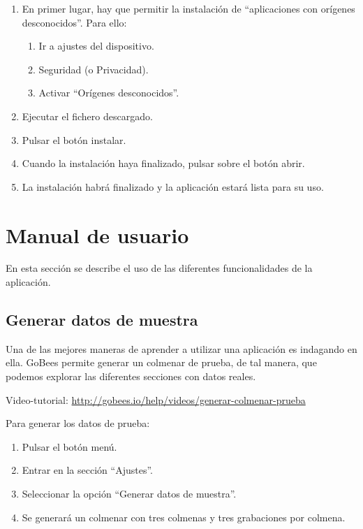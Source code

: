 \begin{enumerate}
\def\labelenumi{\arabic{enumi}.}
\tightlist
\item
  En primer lugar, hay que permitir la instalación de ``aplicaciones con
  orígenes desconocidos''. Para ello:

  \begin{enumerate}
  \def\labelenumii{\alph{enumii}.}
  \tightlist
  \item
    Ir a ajustes del dispositivo.
  \item
    Seguridad (o Privacidad).
  \item
    Activar ``Orígenes desconocidos''.
  \end{enumerate}
\item
  Ejecutar el fichero descargado.
\item
  Pulsar el botón instalar.
\item
  Cuando la instalación haya finalizado, pulsar sobre el botón abrir.
\item
  La instalación habrá finalizado y la aplicación estará lista para su
  uso.
\end{enumerate}

\section{Manual de usuario}\label{manual-de-usuario-1}

En esta sección se describe el uso de las diferentes funcionalidades de
la aplicación.

\subsection{Generar datos de muestra}\label{generar-datos-de-muestra}

Una de las mejores maneras de aprender a utilizar una aplicación es
indagando en ella. GoBees permite generar un colmenar de prueba, de tal
manera, que podemos explorar las diferentes secciones con datos reales.

Video-tutorial:
\url{http://gobees.io/help/videos/generar-colmenar-prueba}

Para generar los datos de prueba:

\begin{enumerate}
\def\labelenumi{\arabic{enumi}.}
\tightlist
\item
  Pulsar el botón menú.
\item
  Entrar en la sección ``Ajustes''.
\item
  Seleccionar la opción ``Generar datos de muestra''.
\item
  Se generará un colmenar con tres colmenas y tres grabaciones por
  colmena.
\end{enumerate}

